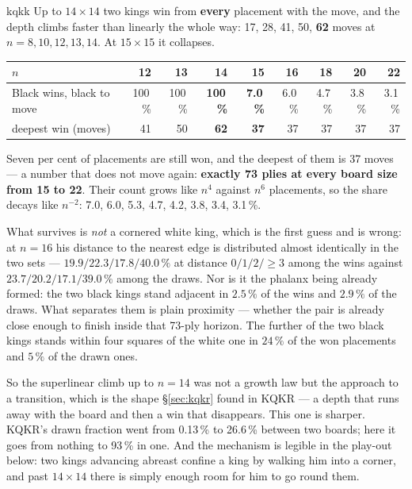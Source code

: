 \documentclass[11pt]{article}
\begin{document}
\begin{result}[title={The hunt has a critical board size, and it is between 14 and 15}]{kqkk}
Up to $14\times14$ two kings win from \textbf{every} placement with the move,
and the depth climbs faster than linearly the whole way: 17, 28, 41, 50,
\textbf{62} moves at $n = 8, 10, 12, 13, 14$. At $15\times15$ it collapses.

\smallskip
\begin{center}\small
\begin{tabular}{@{}lrrrrrrrr@{}}
\toprule
$n$ & 12 & 13 & \textbf{14} & \textbf{15} & 16 & 18 & 20 & 22 \\
\midrule
Black wins, black to move & 100\,\% & 100\,\% & \textbf{100\,\%} & \textbf{7.0\,\%}
  & 6.0\,\% & 4.7\,\% & 3.8\,\% & 3.1\,\% \\
deepest win (moves)       & 41 & 50 & \textbf{62} & \textbf{37} & 37 & 37 & 37 & 37 \\
\bottomrule
\end{tabular}
\end{center}

\smallskip
Seven per cent of placements are still won, and the deepest of them is 37
moves --- a number that does not move again: \textbf{exactly 73 plies at every
board size from 15 to 22}. Their count grows like $n^4$ against $n^6$
placements, so the share decays like $n^{-2}$: 7.0, 6.0, 5.3, 4.7, 4.2, 3.8,
3.4, 3.1\,\%.

\smallskip
What survives is \emph{not} a cornered white king, which is the first guess and
is wrong: at $n=16$ his distance to the nearest edge is distributed almost
identically in the two sets --- $19.9/22.3/17.8/40.0\,\%$ at distance
$0/1/2/{\ge}3$ among the wins against $23.7/20.2/17.1/39.0\,\%$ among the
draws. Nor is it the phalanx being already formed: the two black kings stand
adjacent in $2.5\,\%$ of the wins and $2.9\,\%$ of the draws. What separates
them is plain proximity --- whether the pair is already close enough to finish
inside that 73-ply horizon. The further of the two black kings stands within
four squares of the white one in $24\,\%$ of the won placements and
$5\,\%$ of the drawn ones.
\end{result}

\noindent
So the superlinear climb up to $n=14$ was not a growth law but the approach to
a transition, which is the shape \S\ref{sec:kqkr} found in KQKR --- a depth that runs away
with the board and then a win that disappears. This one is sharper. KQKR's
drawn fraction went from 0.13\,\% to 26.6\,\% between two boards; here it goes
from nothing to 93\,\% in one. And the mechanism is legible in the play-out
below: two kings advancing abreast confine a king by walking him into a corner,
and past $14\times14$ there is simply enough room for him to go round them.
\end{document}
